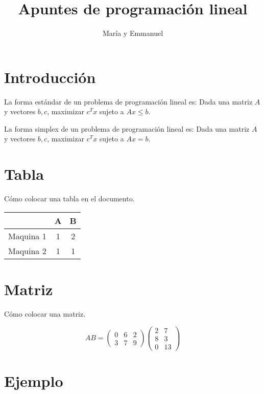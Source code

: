 \documentclass{article}
\title{Apuntes de programación lineal}
\author{María y Emmanuel}
\begin{document}
\maketitle

\tableofcontents

\section{Introducción}

La forma estándar de un problema de programación lineal es:
Dada una matriz $A$ y vectores $b,c$, maximizar $c^Tx$ sujeto a
$Ax\leq b$.

La forma simplex de un problema de programación lineal es:
Dada una matriz $A$ y vectores $b,c$, maximizar $c^Tx$ sujeto a
$Ax= b$.

\section{Tabla}

Cómo colocar una tabla en el documento.

\bigskip

\begin{tabular}{|c|c|c|}
  \hline
  &A&B\\
  \hline
  Maquina 1&1&2\\
  Maquina 2&1&1\\
  \hline
  
\end{tabular}

\section{Matriz}

Cómo colocar una matriz.

\begin{equation}
  \label{eq:1}
 AB=\begin{pmatrix}
    0&6&2\\
    3&7&9
  \end{pmatrix}
  \begin{pmatrix}
    2&7\\
    8&3\\
    0&13
  \end{pmatrix}  
\end{equation}

\section{Ejemplo}
\end{document}
